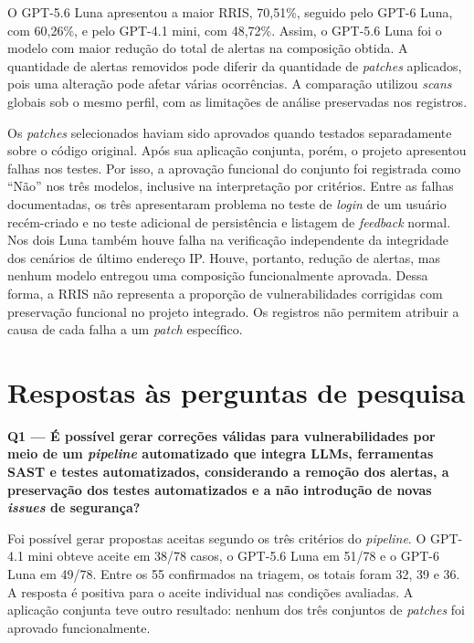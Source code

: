 O GPT-5.6 Luna apresentou a maior RRIS, 70,51\%, seguido pelo GPT-6 Luna, com 60,26\%, e pelo GPT-4.1 mini, com 48,72\%. Assim, o GPT-5.6 Luna foi o modelo com maior redução do total de alertas na composição obtida. A quantidade de alertas removidos pode diferir da quantidade de \textit{patches} aplicados, pois uma alteração pode afetar várias ocorrências. A comparação utilizou \textit{scans} globais sob o mesmo perfil, com as limitações de análise preservadas nos registros.

Os \textit{patches} selecionados haviam sido aprovados quando testados separadamente sobre o código original. Após sua aplicação conjunta, porém, o projeto apresentou falhas nos testes. Por isso, a aprovação funcional do conjunto foi registrada como ``Não'' nos três modelos, inclusive na interpretação por critérios. Entre as falhas documentadas, os três apresentaram problema no teste de \textit{login} de um usuário recém-criado e no teste adicional de persistência e listagem de \textit{feedback} normal. Nos dois Luna também houve falha na verificação independente da integridade dos cenários de último endereço IP. Houve, portanto, redução de alertas, mas nenhum modelo entregou uma composição funcionalmente aprovada. Dessa forma, a RRIS não representa a proporção de vulnerabilidades corrigidas com preservação funcional no projeto integrado. Os registros não permitem atribuir a causa de cada falha a um \textit{patch} específico.

\section{Respostas às perguntas de pesquisa}
\label{sec:res-perguntas}

\textbf{Q1 --- É possível gerar correções válidas para vulnerabilidades por meio de um \textit{pipeline} automatizado que integra LLMs, ferramentas SAST e testes automatizados, considerando a remoção dos alertas, a preservação dos testes automatizados e a não introdução de novas \textit{issues} de segurança?}

Foi possível gerar propostas aceitas segundo os três critérios do \textit{pipeline}. O GPT-4.1 mini obteve aceite em 38/78 casos, o GPT-5.6 Luna em 51/78 e o GPT-6 Luna em 49/78. Entre os 55 confirmados na triagem, os totais foram 32, 39 e 36. A resposta é positiva para o aceite individual nas condições avaliadas. A aplicação conjunta teve outro resultado: nenhum dos três conjuntos de \textit{patches} foi aprovado funcionalmente.

